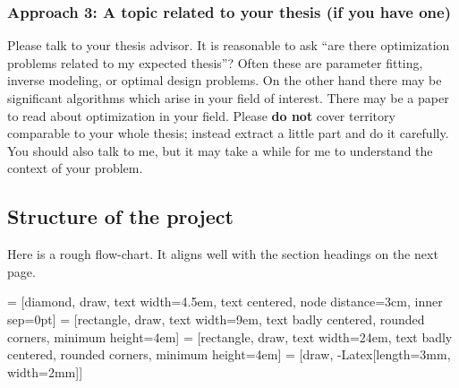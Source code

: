 \documentclass[12pt]{amsart}
\begin{document}
\subsubsection*{Approach 3: A topic related to your thesis (if you have one)}  Please talk to your thesis advisor.  It is reasonable to ask ``are there optimization problems related to my expected thesis''?  Often these are parameter fitting, inverse modeling, or optimal design problems.  On the other hand there may be significant algorithms which arise in your field of interest.  There may be a paper to read about optimization in your field.  Please \textbf{do not} cover territory comparable to your whole thesis; instead extract a little part and do it carefully.  You should also talk to me, but it may take a while for me to understand the context of your problem.


\newpage
\subsection*{Structure of the project}  Here is a rough flow-chart.  It aligns well with the section headings on the next page.

\bigskip

 = [diamond, draw,
    text width=4.5em, text centered, node distance=3cm, inner sep=0pt]
 = [rectangle, draw,
    text width=9em, text badly centered, rounded corners, minimum height=4em]
 = [rectangle, draw,
    text width=24em, text badly centered, rounded corners, minimum height=4em]
 = [draw, -{Latex[length=3mm, width=2mm]}]
\end{document}
